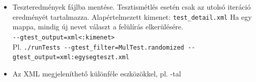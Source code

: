 \begin{frame}
  \begin{itemize}
    \item Teszteredmények fájlba mentése. Tesztismétlés esetén csak az utolsó iteráció eredményét tartalmazza. 
Alapértelmezett kimenet: \texttt{test\_detail.xml} Ha  egy mappa, mindig új nevet választ a felülírás 
elkerülésére. \\ \texttt{{-}-gtest\_output=xml<:kimenet>} \\ \scriptsize
    Pl. \texttt{./runTests {-}-gtest\_filter=MulTest.randomized {-}-gtest\_output=xml:egysegteszt.xml}
  \end{itemize}
  \begin{block}{}
  \end{block}
  \begin{itemize}
    \item Az XML megjeleníthető különféle eszközökkel, pl. %
-tal
  \end{itemize}
\end{frame}